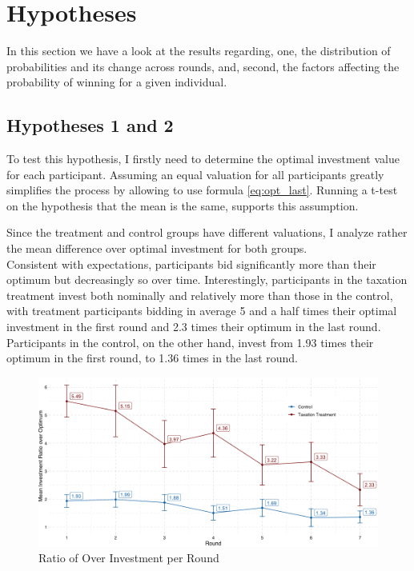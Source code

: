 \section{Hypotheses}

In this section we have a look at the results regarding, one, the distribution of probabilities and its change across rounds, and, second, the factors affecting the probability of winning for a given individual.


\subsection{Hypotheses 1 and 2}

To test this hypothesis, I firstly need to determine the optimal investment value for each participant. Assuming an equal valuation for all participants greatly simplifies the process by allowing to use formula \ref{eq:opt_last}. Running a t-test on the hypothesis that the mean is the same, supports this assumption.

Since the treatment and control groups have different valuations, I analyze rather the mean difference over optimal investment for both groups.\\

Consistent with expectations, participants bid significantly more than their optimum but decreasingly so over time. Interestingly, participants in the taxation treatment invest both nominally and relatively more than those in the control, with treatment participants bidding in average 5 and a half times their optimal investment in the first round and 2.3 times their optimum in the last round. Participants in the control, on the other hand, invest from 1.93 times their optimum in the first round, to 1.36 times in the last round.\\


\begin{figure}
    \centering
    \includegraphics[width=\textwidth]{graphs/over_invest.png}
    \caption{Ratio of Over Investment per Round}
    \label{fig:over_invest}
\end{figure}

